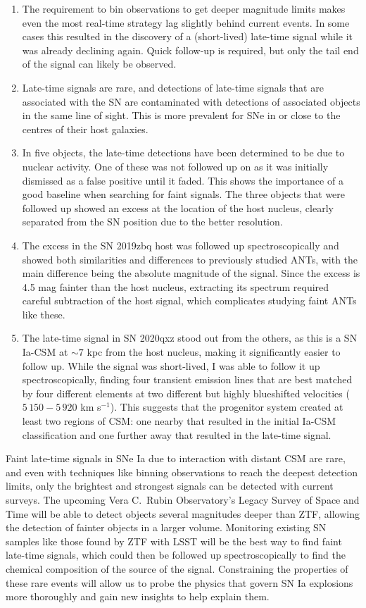 \documentclass[a4paper,oneside,12pt, class=Latex/Classes/PhDthesisPSnPDF, crop=false]{standalone}
\begin{document}
\begin{enumerate}
    \item The requirement to bin observations to get deeper magnitude limits makes even the most real-time strategy lag slightly behind current events. In some cases this resulted in the discovery of a (short-lived) late-time signal while it was already declining again. Quick follow-up is required, but only the tail end of the signal can likely be observed.
    \item Late-time signals are rare, and detections of late-time signals that are associated with the SN are contaminated with detections of associated objects in the same line of sight. This is more prevalent for SNe in or close to the centres of their host galaxies.
    \item In five objects, the late-time detections have been determined to be due to nuclear activity. One of these was not followed up on as it was initially dismissed as a false positive until it faded. This shows the importance of a good baseline when searching for faint signals. The three objects that were followed up showed an excess at the location of the host nucleus, clearly separated from the SN position due to the better resolution.
    \item The excess in the SN 2019zbq host was followed up spectroscopically and showed both similarities and differences to previously studied ANTs, with the main difference being the absolute magnitude of the signal. Since the excess is 4.5 mag fainter than the host nucleus, extracting its spectrum required careful subtraction of the host signal, which complicates studying faint ANTs like these.
    \item The late-time signal in SN 2020qxz stood out from the others, as this is a SN Ia-CSM at $\sim7$ kpc from the host nucleus, making it significantly easier to follow up. While the signal was short-lived, I was able to follow it up spectroscopically, finding four transient emission lines that are best matched by four different elements at two different but highly blueshifted velocities ($5\,150 - 5\,920$ km s$^{-1}$). This suggests that the progenitor system created at least two regions of CSM: one nearby that resulted in the initial Ia-CSM classification and one further away that resulted in the late-time signal.
\end{enumerate}

Faint late-time signals in SNe Ia due to interaction with distant CSM are rare, and even with techniques like binning observations to reach the deepest detection limits, only the brightest and strongest signals can be detected with current surveys. The upcoming Vera C.~Rubin Observatory's Legacy Survey of Space and Time \cite[LSST;][]{LSST} will be able to detect objects several magnitudes deeper than ZTF, allowing the detection of fainter objects in a larger volume. Monitoring existing SN samples like those found by ZTF with LSST will be the best way to find faint late-time signals, which could then be followed up spectroscopically to find the chemical composition of the source of the signal. Constraining the properties of these rare events will allow us to probe the physics that govern SN Ia explosions more thoroughly and gain new insights to help explain them.
\end{document}

